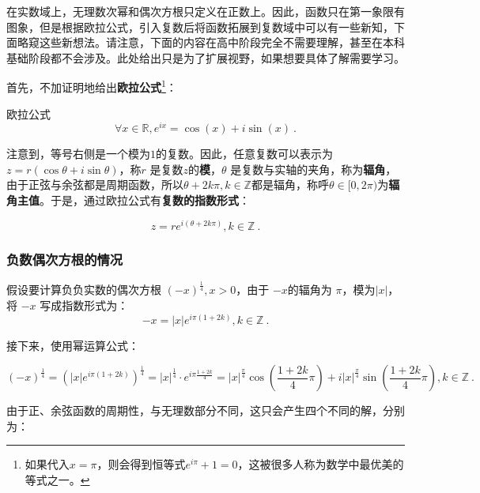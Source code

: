 
在实数域上，无理数次幂和偶次方根只定义在正数上。因此，函数只在第一象限有图象，但是根据欧拉公式，引入复数后将函数拓展到复数域中可以有一些新知，下面略窥这些新想法。请注意，下面的内容在高中阶段完全不需要理解，甚至在本科基础阶段都不会涉及。此处给出只是为了扩展视野，如果想要具体了解需要学习。

首先，不加证明地给出\textbf{欧拉公式}\footnote{如果代入$x=\pi$，则会得到恒等式$e^{i\pi}+1=0$，这被很多人称为数学中最优美的等式之一。}：

\begin{theorem}{欧拉公式}
\begin{equation}
\forall x\in\mathbb{R},e^{ix} = \cos(x) + i\sin(x)~.
\end{equation}
\end{theorem}

注意到，等号右侧是一个模为$1$的复数。因此，任意复数可以表示为 $z = r (\cos \theta + i \sin \theta)$，称$r$ 是复数$z$的\textbf{模}，$\theta$ 是复数与实轴的夹角，称为\textbf{辐角}，由于正弦与余弦都是周期函数，所以$\theta+2k\pi,k\in\mathbb{Z}$都是辐角，称呼$\theta\in[0,2\pi)$为\textbf{辐角主值}。于是，通过欧拉公式有\textbf{复数的指数形式}：

\begin{equation}
z = r e^{i(\theta+2k\pi)},k\in\mathbb{Z}~.
\end{equation}

\subsubsection{负数偶次方根的情况}

假设要计算负负实数的偶次方根 $(-x)^{\frac{1}{4}},x>0$，由于 $-x$的辐角为 $\pi$，模为$|x|$，将 $-x$ 写成指数形式为：
\begin{equation}
-x = |x| e^{i\pi(1+2k)},k\in\mathbb{Z}~.
\end{equation}

接下来，使用幂运算公式：

\begin{equation}
\displaystyle
(-x)^{\frac{1}{4}} = \left( |x| e^{i\pi(1+2k)} \right)^{\frac{1}{4}} =|x|^{\frac{1}{4}} \cdot e^{i\pi\frac{1+2k}{4}}=|x|^{\frac{\pi}{4}}\cos(\frac{1+2k}{4}\pi) + i|x|^{\frac{\pi}{4}}\sin(\frac{1+2k}{4}\pi),k\in\mathbb{Z}~.
\end{equation}

由于正、余弦函数的周期性，与无理数部分不同，这只会产生四个不同的解，分别为：

